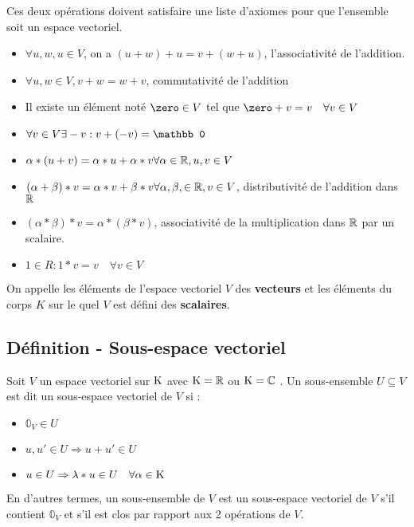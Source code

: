 \documentclass[12pt]{article}
\begin{document}
Ces deux opérations doivent satisfaire une liste d'axiomes pour que l'ensemble soit un espace vectoriel.
\begin{itemize}
    \item $\forall u,w,u \in V$, on a $(u+w)+u=v+(w+u)$, l'associativité de l'addition.
    \item $\forall u,w \in V, v+w = w+v$, commutativité de l'addition
    \item Il existe un élément noté $\zero \in V$ tel que $\zero +v = v \quad \forall v \in V$
    \item $\forall v \in V \space \exists -v : v + (-v) = \mathbb 0$
    \item $\alpha * (u+v) = \alpha*u+\alpha*v \space \forall \alpha \in \mathbb{R}, u,v \in V$
    \item $(\alpha + \beta) * v = \alpha * v + \beta * v \space \forall \alpha, \beta, \in \mathbb{R}, v \in V$, distributivité de l'addition dans $\mathbb{R}$
    \item $(\alpha*\beta)*v=\alpha*(\beta*v)$, associativité de la multiplication dans $\mathbb{R}$ par un scalaire.
    \item $1 \in R : 1*v=v \quad \forall v \in V$ 
\end{itemize}

On appelle les éléments de l'espace vectoriel $V$ des \textbf{vecteurs} et les éléments du corps $K$ sur le quel $V$ est défini des \textbf{scalaires}.

\subsection{Définition - Sous-espace vectoriel}
Soit $V$ un espace vectoriel sur $\mathrm{K}$ avec $\mathrm{K} = \mathbb{R}$ ou $\mathrm{K} = \mathbb{C}$ . Un sous-ensemble $U \subseteq V$ est dit un sous-espace vectoriel de $V$ si :
\begin{itemize}
    \item $\mathbb 0_V \in U$
    \item $u, u' \in U \Rightarrow u+u' \in U$
    \item $u \in U \Rightarrow \lambda * u \in U \quad \forall \alpha \in \mathrm{K}$
\end{itemize}

En d'autres termes, un sous-ensemble de $V$ est un sous-espace vectoriel de $V$ s'il contient $\mathbb 0_V$ et s'il est clos par rapport aux 2 opérations de $V$.
\end{document}
